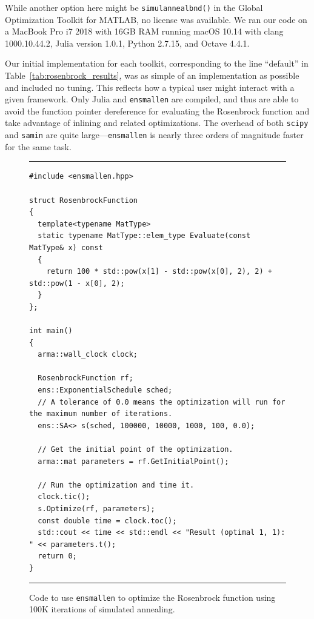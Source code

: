 While another option here might be {\tt simulannealbnd()}
in the Global Optimization Toolkit for MATLAB,
no license was available.
We ran our code on a MacBook Pro i7 2018 with 16GB RAM running macOS 10.14 with clang 1000.10.44.2, Julia version 1.0.1, Python 2.7.15, and Octave 4.4.1.

Our initial implementation for each toolkit, corresponding to the line
``default'' in Table~\ref{tab:rosenbrock_results}, was as simple of an
implementation as possible and included no tuning.  This reflects how a typical
user might interact with a given framework.  Only Julia and {\tt ensmallen} are
compiled, and thus are able to avoid the function pointer dereference for
evaluating the Rosenbrock function and take advantage of inlining and related
optimizations.  The overhead of both {\tt scipy} and {\tt samin} are quite
large---{\tt ensmallen} is nearly three orders of magnitude faster for the same
task.

\begin{figure}[t!]
\hrule
\vspace{1ex}
\begin{verbatim}
#include <ensmallen.hpp>

struct RosenbrockFunction
{
  template<typename MatType>
  static typename MatType::elem_type Evaluate(const MatType& x) const
  {
    return 100 * std::pow(x[1] - std::pow(x[0], 2), 2) + std::pow(1 - x[0], 2);
  }
};

int main()
{
  arma::wall_clock clock;

  RosenbrockFunction rf;
  ens::ExponentialSchedule sched;
  // A tolerance of 0.0 means the optimization will run for the maximum number of iterations.
  ens::SA<> s(sched, 100000, 10000, 1000, 100, 0.0);

  // Get the initial point of the optimization.
  arma::mat parameters = rf.GetInitialPoint();

  // Run the optimization and time it.
  clock.tic();
  s.Optimize(rf, parameters);
  const double time = clock.toc();
  std::cout << time << std::endl << "Result (optimal 1, 1): " << parameters.t();
  return 0;
}
\end{verbatim}
\hrule
\vspace*{-0.5em}
\caption{Code to use {\tt ensmallen} to optimize the Rosenbrock function using
100K iterations of simulated annealing.}
\label{fig:rosenbrock_run}
\end{figure}

